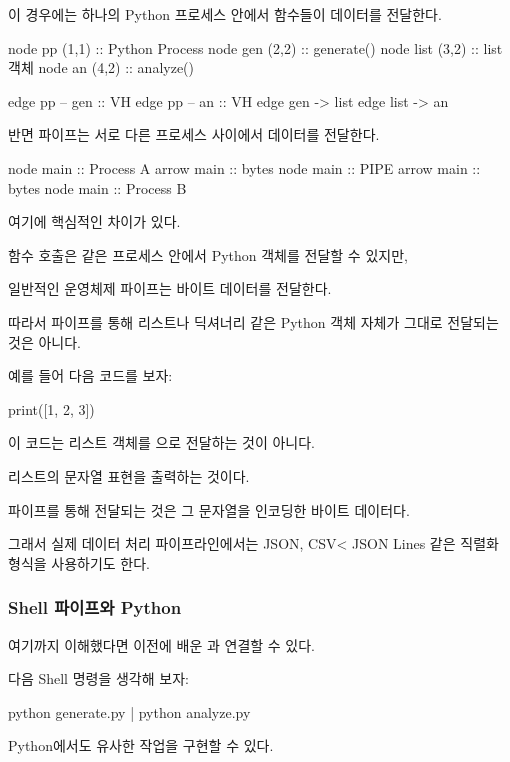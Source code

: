 이 경우에는 하나의 Python 프로세스 안에서 함수들이 데이터를 전달한다.

\begin{dhkdiagram}[in=6]
node pp (1,1) :: Python Process
node gen (2,2) :: generate()
node list (3,2) :: list 객체
node an (4,2) :: analyze()

edge pp -- gen :: VH
edge pp -- an :: VH
edge gen -> list
edge list -> an
\end{dhkdiagram}

반면 파이프는 서로 다른 프로세스 사이에서 데이터를 전달한다.

\begin{dhkbranch}
node main :: Process A
arrow main :: bytes
node main :: PIPE
arrow main :: bytes
node main :: Process B
\end{dhkbranch}

여기에 핵심적인 차이가 있다.

함수 호출은 같은 프로세스 안에서 Python 객체를 전달할 수 있지만,

일반적인 운영체제 파이프는 바이트 데이터를 전달한다.

따라서 파이프를 통해 리스트나 딕셔너리 같은 Python 객체 자체가 그대로 전달되는 것은 아니다.

예를 들어 다음 코드를 보자:

\begin{dhkcode}
print([1, 2, 3])
\end{dhkcode}

이 코드는 리스트 객체를 으로 전달하는 것이 아니다.

리스트의 문자열 표현을 출력하는 것이다.

파이프를 통해 전달되는 것은 그 문자열을 인코딩한 바이트 데이터다.

그래서 실제 데이터 처리 파이프라인에서는 JSON, CSV< JSON Lines 같은 직렬화 형식을 사용하기도 한다.

\subsubsection{Shell 파이프와 Python }

여기까지 이해했다면 이전에 배운 과 연결할 수 있다.

다음 Shell 명령을 생각해 보자:

\begin{dhkzsh}
python generate.py | python analyze.py
\end{dhkzsh}

Python에서도 유사한 작업을 구현할 수 있다.

